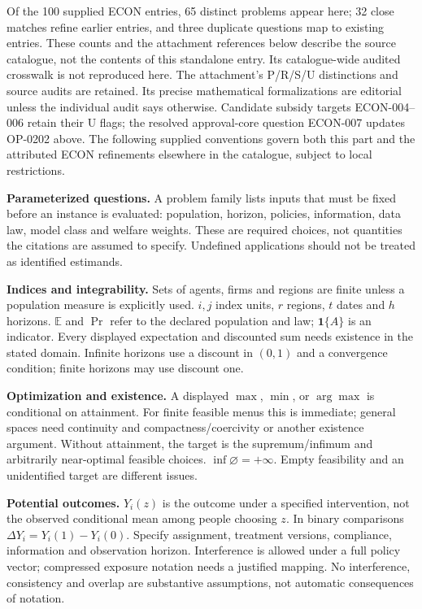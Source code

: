 \documentclass[11pt,a4paper]{article}
\begin{document}
\label{audited:conventions}

Of the 100 supplied ECON entries, 65 distinct problems appear here; 32 close
matches refine earlier entries, and three duplicate questions map to existing
entries. These counts and the attachment references below describe the source catalogue, not the contents of this standalone entry. Its catalogue-wide audited crosswalk is not reproduced here.
The attachment's P/R/S/U distinctions and source audits are retained. Its
precise mathematical formalizations are editorial unless the individual audit
says otherwise. Candidate subsidy targets ECON-004--006 retain their U flags;
the resolved approval-core question ECON-007 updates OP-0202 above.
The following supplied conventions govern both this part and the attributed
ECON refinements elsewhere in the catalogue, subject to local restrictions.

\textbf{Parameterized questions.} A problem family lists inputs that must be fixed before an instance is evaluated: population, horizon, policies, information, data law, model class and welfare weights. These are required choices, not quantities the citations are assumed to specify. Undefined applications should not be treated as identified estimands.

\textbf{Indices and integrability.} Sets of agents, firms and regions are finite unless a population measure is explicitly used. \(i,j\) index units, \(r\) regions, \(t\) dates and \(h\) horizons. \(\mathbb E\) and \(\Pr\) refer to the declared population and law; \(\mathbf1\{A\}\) is an indicator. Every displayed expectation and discounted sum needs existence in the stated domain. Infinite horizons use a discount in \((0,1)\) and a convergence condition; finite horizons may use discount one.

\textbf{Optimization and existence.} A displayed \(\max\), \(\min\), or \(\arg\max\) is conditional on attainment. For finite feasible menus this is immediate; general spaces need continuity and compactness/coercivity or another existence argument. Without attainment, the target is the supremum/infimum and arbitrarily near-optimal feasible choices. \(\inf\varnothing=+\infty\). Empty feasibility and an unidentified target are different issues.

\textbf{Potential outcomes.} \(Y_i(z)\) is the outcome under a specified intervention, not the observed conditional mean among people choosing \(z\). In binary comparisons \(\Delta Y_i=Y_i(1)-Y_i(0)\). Specify assignment, treatment versions, compliance, information and observation horizon. Interference is allowed under a full policy vector; compressed exposure notation needs a justified mapping. No interference, consistency and overlap are substantive assumptions, not automatic consequences of notation.
\end{document}

